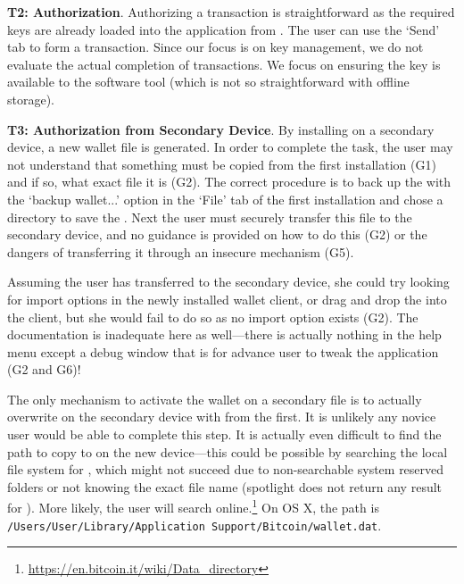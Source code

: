 \textbf{T2: Authorization}.
Authorizing a transaction is straightforward as the required keys are already loaded into the application from \walletfile. The user can use the `Send' tab to form a transaction. Since our focus is on key management, we do not evaluate the actual completion of transactions. We focus on ensuring the key is available to the software tool (which is not so straightforward with \eg offline storage). 

\textbf{T3: Authorization from Secondary Device}.
By installing \bitcoinclient on a secondary device, a new wallet file is generated. In order to complete the task, the user may not understand that something must be copied from the first installation (G1) and if so, what exact file it is (G2). The correct procedure is to back up the \walletfile with the `backup wallet...' option in the `File' tab of the first installation and chose a directory to save the \walletfile. Next the user must securely transfer this file to the secondary device, and no guidance is provided on how to do this (G2) or the dangers of transferring it through an insecure mechanism (G5).

Assuming the user has transferred \walletfile to the secondary device, she could try looking for import options in the newly installed wallet client, or drag and drop the \walletfile into the client, but she would fail to do so as no import option exists (G2). The documentation is inadequate here as well---there is actually nothing in the help menu except a debug window that is for advance user to tweak the application (G2 and G6)!

The only mechanism to activate the wallet on a secondary file is to actually overwrite \walletfile on the secondary device with \walletfile from the first. It is unlikely any novice user would be able to complete this step. It is actually even difficult to find the path to copy \walletfile to on the new device---this could be possible by searching the local file system for \walletfile, which might not succeed due to non-searchable system reserved folders or not knowing the exact file name (spotlight does not return any result for \walletfile). More likely, the user will search online.\footnote{\url{https://en.bitcoin.it/wiki/Data_directory}} On OS X, the path is \texttt{/Users/User/Library/Application Support/Bitcoin/wallet.dat}.

